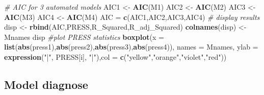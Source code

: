 \documentclass[]{article}
\newenvironment{Shaded}{\begin{snugshade}}{\end{snugshade}}
\newcommand{\KeywordTok}[1]{\textcolor[rgb]{0.13,0.29,0.53}{\textbf{#1}}}
\newcommand{\DataTypeTok}[1]{\textcolor[rgb]{0.13,0.29,0.53}{#1}}
\newcommand{\StringTok}[1]{\textcolor[rgb]{0.31,0.60,0.02}{#1}}
\newcommand{\CommentTok}[1]{\textcolor[rgb]{0.56,0.35,0.01}{\textit{#1}}}
\newcommand{\NormalTok}[1]{#1}
\begin{document}
\begin{Shaded}
\begin{Highlighting}[]
\CommentTok{# AIC for 3 automated models}
\NormalTok{AIC1 <-}\StringTok{ }\KeywordTok{AIC}\NormalTok{(M1)}
\NormalTok{AIC2 <-}\StringTok{ }\KeywordTok{AIC}\NormalTok{(M2)}
\NormalTok{AIC3 <-}\StringTok{ }\KeywordTok{AIC}\NormalTok{(M3)}
\NormalTok{AIC4 <-}\StringTok{ }\KeywordTok{AIC}\NormalTok{(M4)}
\NormalTok{AIC =}\StringTok{ }\KeywordTok{c}\NormalTok{(AIC1,AIC2,AIC3,AIC4)}
\CommentTok{# display results}
\NormalTok{disp <-}\StringTok{ }\KeywordTok{rbind}\NormalTok{(AIC,PRESS,R_Squared,R_adj_Squared)}
\KeywordTok{colnames}\NormalTok{(disp) <-}\StringTok{ }\NormalTok{Mnames}
\NormalTok{disp}
\CommentTok{#plot PRESS statistics}
\KeywordTok{boxplot}\NormalTok{(}\DataTypeTok{x =} \KeywordTok{list}\NormalTok{(}\KeywordTok{abs}\NormalTok{(press1),}\KeywordTok{abs}\NormalTok{(press2),}\KeywordTok{abs}\NormalTok{(press3),}\KeywordTok{abs}\NormalTok{(press4)), }\DataTypeTok{names =}\NormalTok{ Mnames,}
        \DataTypeTok{ylab =} \KeywordTok{expression}\NormalTok{(}\StringTok{"|"}\NormalTok{, PRESS[i], }\StringTok{"|"}\NormalTok{),}\DataTypeTok{col =} \KeywordTok{c}\NormalTok{(}\StringTok{"yellow"}\NormalTok{,}\StringTok{"orange"}\NormalTok{,}\StringTok{"violet"}\NormalTok{,}\StringTok{"red"}\NormalTok{))}
\end{Highlighting}
\end{Shaded}

\subsection{Model diagnose}\label{model-diagnose}
\end{document}
